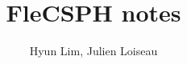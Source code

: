 \documentclass{article}
\begin{document}
\title{FleCSPH notes}

\author{Hyun Lim, Julien Loiseau}

\maketitle
















\nocite{*}



\newpage
\appendix
\end{document}
